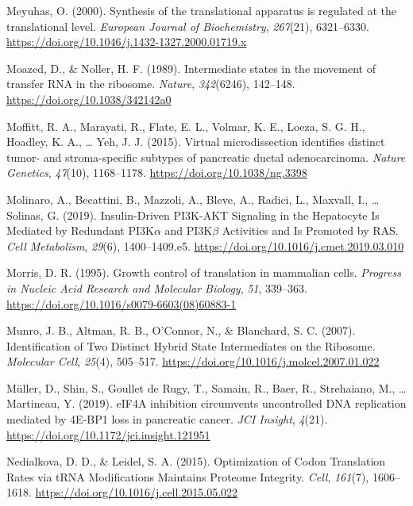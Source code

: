 \documentclass[12pt,openany]{book}
\begin{document}
\hypertarget{ref-Meyuhas2000}{}
Meyuhas, O. (2000). Synthesis of the translational apparatus is
regulated at the translational level. \emph{European Journal of
Biochemistry}, \emph{267}(21), 6321--6330.
\url{https://doi.org/10.1046/j.1432-1327.2000.01719.x}

\hypertarget{ref-Moazed1989}{}
Moazed, D., \& Noller, H. F. (1989). Intermediate states in the movement
of transfer RNA in the ribosome. \emph{Nature}, \emph{342}(6246),
142--148. \url{https://doi.org/10.1038/342142a0}

\hypertarget{ref-Moffitt2015}{}
Moffitt, R. A., Marayati, R., Flate, E. L., Volmar, K. E., Loeza, S. G.
H., Hoadley, K. A., \ldots{} Yeh, J. J. (2015). Virtual microdissection
identifies distinct tumor- and stroma-specific subtypes of pancreatic
ductal adenocarcinoma. \emph{Nature Genetics}, \emph{47}(10),
1168--1178. \url{https://doi.org/10.1038/ng.3398}

\hypertarget{ref-Molinaro2019a}{}
Molinaro, A., Becattini, B., Mazzoli, A., Bleve, A., Radici, L.,
Maxvall, I., \ldots{} Solinas, G. (2019). Insulin-Driven PI3K-AKT
Signaling in the Hepatocyte Is Mediated by Redundant PI3K\(\alpha\) and
PI3K\(\beta\) Activities and Is Promoted by RAS. \emph{Cell Metabolism},
\emph{29}(6), 1400--1409.e5.
\url{https://doi.org/10.1016/j.cmet.2019.03.010}

\hypertarget{ref-Morris1995}{}
Morris, D. R. (1995). Growth control of translation in mammalian cells.
\emph{Progress in Nucleic Acid Research and Molecular Biology},
\emph{51}, 339--363. \url{https://doi.org/10.1016/s0079-6603(08)60883-1}

\hypertarget{ref-Munro2007}{}
Munro, J. B., Altman, R. B., O'Connor, N., \& Blanchard, S. C. (2007).
Identification of Two Distinct Hybrid State Intermediates on the
Ribosome. \emph{Molecular Cell}, \emph{25}(4), 505--517.
\url{https://doi.org/10.1016/j.molcel.2007.01.022}

\hypertarget{ref-Muller2019}{}
Müller, D., Shin, S., Goullet de Rugy, T., Samain, R., Baer, R.,
Strehaiano, M., \ldots{} Martineau, Y. (2019). eIF4A inhibition
circumvents uncontrolled DNA replication mediated by 4E-BP1 loss in
pancreatic cancer. \emph{JCI Insight}, \emph{4}(21).
\url{https://doi.org/10.1172/jci.insight.121951}

\hypertarget{ref-Nedialkova2015}{}
Nedialkova, D. D., \& Leidel, S. A. (2015). Optimization of Codon
Translation Rates via tRNA Modifications Maintains Proteome Integrity.
\emph{Cell}, \emph{161}(7), 1606--1618.
\url{https://doi.org/10.1016/j.cell.2015.05.022}
\end{document}
